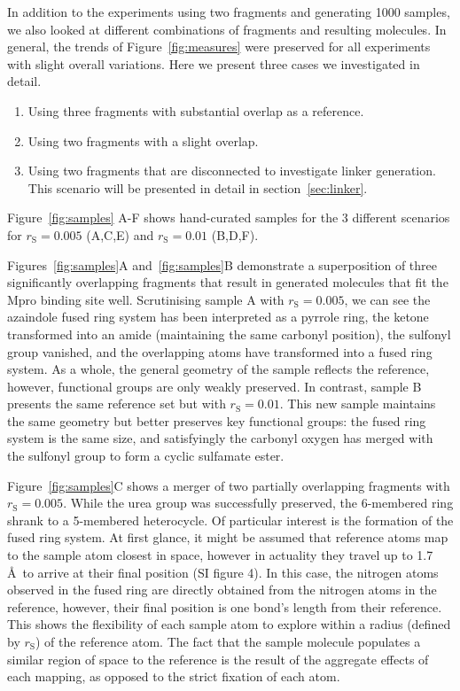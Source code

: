 \documentclass[journal=jacsat,manuscript=article]{achemso}
\begin{document}
In addition to the experiments using two fragments and generating 1000 samples, we also looked at different combinations of fragments and resulting molecules. In general, the trends of Figure~\ref{fig:measures} were preserved for all experiments with slight overall variations. Here we present three cases we investigated in detail.
\begin{enumerate}
    \item Using three fragments with substantial overlap as a reference.
    \item Using two fragments with a slight overlap. 
    \item Using two fragments that are disconnected to investigate linker generation. This scenario will be presented in detail in section~\ref{sec:linker}.
\end{enumerate}

Figure~\ref{fig:samples} A-F shows hand-curated samples for the 3 different scenarios for $r_{\mathrm{S}}=0.005$ (A,C,E) and $r_{\mathrm{S}}=0.01$ (B,D,F).

Figures~\ref{fig:samples}A and~\ref{fig:samples}B demonstrate a superposition of three significantly overlapping fragments that result in generated molecules that fit the Mpro binding site well. Scrutinising sample A with $r_{\mathrm{S}}=0.005$, we can see the azaindole fused ring system has been interpreted as a pyrrole ring, the ketone transformed into an amide (maintaining the same carbonyl position), the sulfonyl group vanished, and the overlapping atoms have transformed into a fused ring system. As a whole, the general geometry of the sample reflects the reference, however, functional groups are only weakly preserved. In contrast, sample B presents the same reference set but with $r_{\mathrm{S}}=0.01$. This new sample maintains the same geometry but better preserves key functional groups: the fused ring system is the same size, and satisfyingly the carbonyl oxygen has merged with the sulfonyl group to form a cyclic sulfamate ester.


Figure~\ref{fig:samples}C shows a merger of two partially overlapping fragments with $r_{\mathrm{S}}=0.005$. While the urea group was successfully preserved, the 6-membered ring shrank to a 5-membered heterocycle. Of particular interest is the formation of the fused ring system. At first glance, it might be assumed that reference atoms map to the sample atom closest in space, however in actuality they travel up to 1.7 \AA~to arrive at their final position (SI figure 4). In this case, the nitrogen atoms observed in the fused ring are directly obtained from the nitrogen atoms in the reference, however, their final position is one bond’s length from their reference. This shows the flexibility of each sample atom to explore within a radius (defined by $r_{\mathrm{S}}$) of the reference atom. The fact that the sample molecule populates a similar region of space to the reference is the result of the aggregate effects of each mapping, as opposed to the strict fixation of each atom. 
\end{document}
